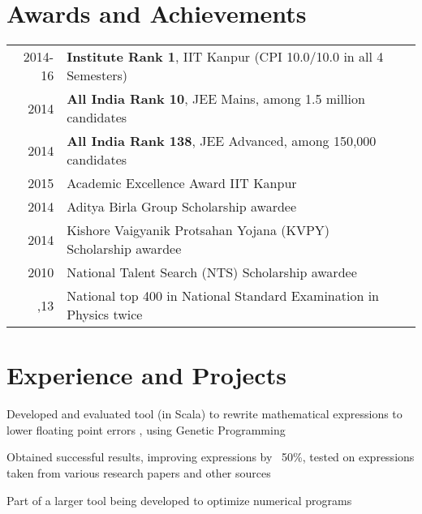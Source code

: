 \documentclass[a4paper]{deedy-resume} %
\newcommand{\onepage}[1]{
  \ifdefined\onep
  #1
  \fi
}
\begin{document}
\begin{minipage}[t]{0.66\textwidth}

  \section{Awards and Achievements}

  \begin{tabular}{rll}
    2014-16	 & \textbf{Institute Rank 1}, IIT Kanpur (CPI 10.0/10.0 in all 4 Semesters)\\
    2014	 & \textbf{All India Rank 10}, JEE Mains, among 1.5 million candidates\\
    2014	 & \textbf{All India Rank 138}, JEE Advanced, among 150,000 candidates\\
    2015	 & Academic Excellence Award IIT Kanpur\\
    2014   & Aditya Birla Group Scholarship awardee\\
    2014   & Kishore Vaigyanik Protsahan Yojana (KVPY) Scholarship awardee\\
    2010   & National Talent Search (NTS) Scholarship awardee\\
    \onepage{2012,13 & National top 400 in National Standard
                       Examination in Physics twice}
  \end{tabular}

  \sectionspace %


  \section{Experience and Projects}

  \runsubsection{}
   
  \vspace{\topsep}
  \begin{tightitemize}
  \item Developed and evaluated tool (in Scala) to rewrite
    mathematical expressions to lower floating point errors\onepage{, using
      Genetic Programming}
  \item	Obtained successful results, improving expressions by ~50\%,
    tested on expressions taken from various research papers and other
    sources
  \item Part of a larger tool being developed to optimize numerical
    programs
  \end{tightitemize}


\end{minipage}
\end{document}
